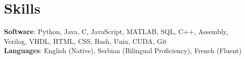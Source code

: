 \section{Skills}
    \begin{itemize}[leftmargin=0.15in, label={}]
	\small{\item{
		\textbf{Software}{: Python, Java, C, JavaScript, MATLAB, SQL, C++, Assembly, Verilog, VHDL, HTML, CSS, Bash, Unix, CUDA, Git} \\
		\textbf{Languages}{: English (Native), Serbian (Bilingual Proficiency), French (Fluent)} \\
        
	}}
    \end{itemize}

